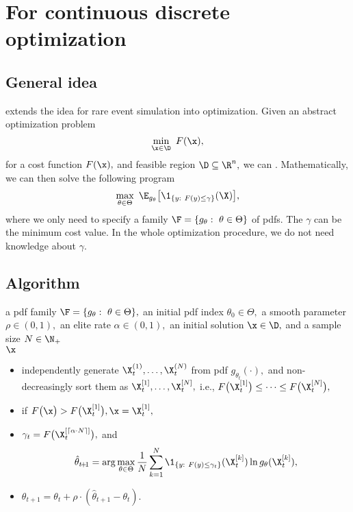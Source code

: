 \section{For continuous discrete optimization}
\subsection{General idea}

	 extends the idea for rare event simulation into optimization. Given an abstract optimization problem
	\begin{equation*}
		\min_{\x \in \D}\ F(\x),
	\end{equation*}
	for a cost function $F(\x),$ and feasible region $\D\subseteq \R^n,$ we can
	. Mathematically, we can then solve the following program
	\begin{equation}\label{eq:Optimization_Obj}
		\max_{\theta \in \Theta}\ \E_{g_{\theta}} \big[\1_{\{y:\ F(y)\le \gamma\}}(\X)\big],
	\end{equation}
	where we only need to specify a family $\F=\{g_{\theta}:\ \theta\in \Theta\}$ of pdfs.
	The $\gamma$ can be the minimum cost value. In the whole optimization procedure, we do not need knowledge about $\gamma.$

      \subsection[Alg]{Algorithm}

		 a pdf family $\F=\{g_{\theta}:\ \theta\in \Theta\},$ an initial pdf index $\theta_0\in \Theta,$ 
		a smooth parameter $\rho\in (0,1),$ an elite rate $\alpha\in (0,1),$
		an initial solution $\x\in \D,$ and a sample size $N\in \N_+$\\[1ex]
		 $\x$\\[1ex]
		\begin{itemize}
			\item independently generate $\X_t^{(1)}, \ldots, \X_t^{(N)}$ from pdf 
			$g_{\theta_t}(\cdot),$ and non-decreasingly sort them as $\X_t^{[1]}, \ldots, \X_t^{[N]},$ i.e., 
			$F\big(\X_t^{[1]}\big)\le \cdots \le F\big(\X_t^{[N]}\big),$
			\item if $F\big(\x\big)> F\big(\X_t^{[1]}\big), \x=\X_t^{[1]},$
			\item $\gamma_t=F\big(\X_t^{[\lceil\alpha \cdot N\rceil]}\big),$ and
			\begin{equation}\label{eq:CE_Estimate_Optimization}
			\hat{\theta}_{t\!+\!1} = \arg\max_{\theta\in \Theta}\frac{1}{N}\sum_{k=1}^{N} \1_{\{y:\ F(y)\le \gamma_t\}}(\X_t^{[k]}) \ln g_{\theta}(\X_t^{[k]}),
			\end{equation} 
			\item $\theta_{t\!+\!1}=\theta_t+\rho\cdot (\hat{\theta}_{t\!+\!1}-\theta_t).$
		\end{itemize}

